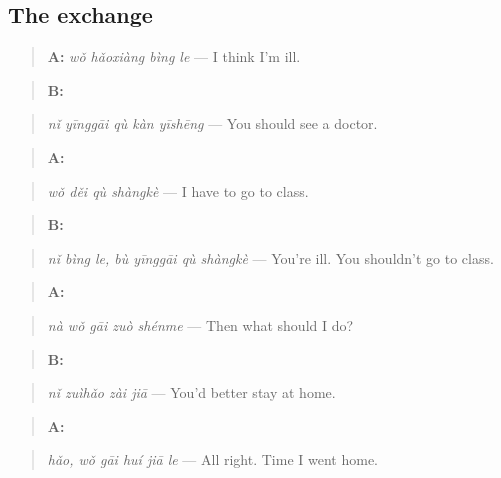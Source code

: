 \subsection*{The exchange}
\begin{quote}
\textbf{A:} \emph{wǒ hǎoxiàng bìng le} — I think I'm ill.
\end{quote}

\begin{quote}
\textbf{B:} 
\end{quote}

\begin{quote}
\emph{nǐ yīnggāi qù kàn yīshēng} — You should see a doctor.
\end{quote}

\begin{quote}
\textbf{A:} 
\end{quote}

\begin{quote}
\emph{wǒ děi qù shàngkè} — I have to go to class.
\end{quote}

\begin{quote}
\textbf{B:}  
\end{quote}

\begin{quote}
\emph{nǐ bìng le, bù yīnggāi qù shàngkè} — You're ill. You shouldn't go to class.
\end{quote}

\begin{quote}
\textbf{A:} 
\end{quote}

\begin{quote}
\emph{nà wǒ gāi zuò shénme} — Then what should I do?
\end{quote}

\begin{quote}
\textbf{B:} 
\end{quote}

\begin{quote}
\emph{nǐ zuìhǎo zài jiā} — You'd better stay at home.
\end{quote}

\begin{quote}
\textbf{A:}  
\end{quote}

\begin{quote}
\emph{hǎo, wǒ gāi huí jiā le} — All right. Time I went home.
\end{quote}

